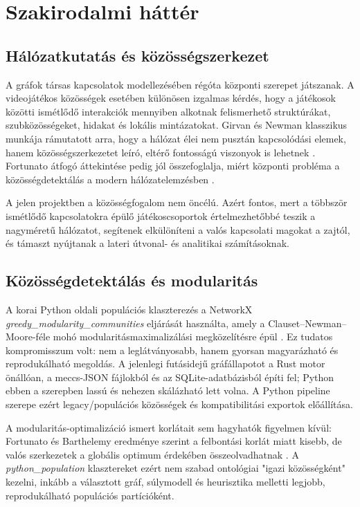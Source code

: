\chapter{Szakirodalmi háttér}

\section{Hálózatkutatás és közösségszerkezet}

A gráfok társas kapcsolatok modellezésében régóta központi szerepet játszanak. A videojátékos közösségek esetében különösen izgalmas kérdés, hogy a játékosok közötti ismétlődő interakciók mennyiben alkotnak felismerhető struktúrákat, szubközösségeket, hidakat és lokális mintázatokat. Girvan és Newman klasszikus munkája rámutatott arra, hogy a hálózat élei nem pusztán kapcsolódási elemek, hanem közösségszerkezetet leíró, eltérő fontosságú viszonyok is lehetnek \cite{girvannewman}. Fortunato átfogó áttekintése pedig jól összefoglalja, miért központi probléma a közösségdetektálás a modern hálózatelemzésben \cite{fortunato2010}.

A jelen projektben a közösségfogalom nem öncélú. Azért fontos, mert a többször ismétlődő kapcsolatokra épülő játékoscsoportok értelmezhetőbbé teszik a nagyméretű hálózatot, segítenek elkülöníteni a valós kapcsolati magokat a zajtól, és támaszt nyújtanak a later\-i útvonal- és analitikai számításoknak.

\section{Közösségdetektálás és modularitás}

A korai Python oldali populációs klaszterezés a NetworkX \textit{greedy\_modularity\_communities} eljárását használta, amely a Clauset--Newman--Moore-féle mohó modularitásmaximalizálási megközelítésre épül \cite{clauset2004,networkx_greedy}. Ez tudatos kompromisszum volt: nem a leglátványosabb, hanem gyorsan magyarázható és reprodukálható megoldás. A jelenlegi futásidejű gráfállapotot a Rust motor önállóan, a meccs-JSON fájlokból és az SQLite-adatbázisból építi fel; Python ebben a szerepben lassú és nehezen skálázható lett volna. A Python pipeline szerepe ezért legacy/populációs közösségek és kompatibilitási exportok előállítása.

A modularitás-optimalizáció ismert korlátait sem hagyhatók figyelmen kívül: Fortunato és Barthelemy eredménye szerint a felbontási korlát miatt kisebb, de valós szerkezetek a globális optimum érdekében összeolvadhatnak \cite{fortunato_barthelemy2007}. A \textit{python\_population} klasztereket ezért nem szabad ontológiai "igazi közösségként" kezelni, inkább a választott gráf, súlymodell és heurisztika melletti legjobb, reprodukálható populációs partícióként.

